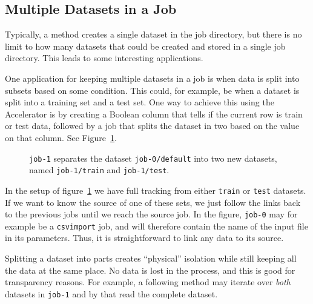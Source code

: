 \subsection{Multiple Datasets in a Job}

Typically, a method creates a single dataset in the job directory, but
there is no limit to how many datasets that could be created and
stored in a single job directory.  This leads to some interesting
applications.

One application for keeping multiple datasets in a job is when data is
split into subsets based on some condition.  This could, for example,
be when a dataset is split into a training set and a test set.  One
way to achieve this using the Accelerator is by creating a Boolean
column that tells if the current row is train or test data, followed
by a job that splits the dataset in two based on the value on that
column.  See Figure~\ref{fig:dep_dataset_csvimport_chain}.

\begin{figure}[h!]
  \hspace{1cm}
  
  \caption{\texttt{job-1} separates the dataset
    \texttt{job-0/default} into two new datasets, named
    \texttt{job-1/train} and \texttt{job-1/test}.}
  \label{fig:dep_dataset_csvimport_chain}
\end{figure}


In the setup of figure~\ref{fig:dep_dataset_csvimport_chain} we have
full tracking from either \texttt{train} or \texttt{test} datasets.
If we want to know the source of one of these sets, we just follow the
links back to the previous jobs until we reach the source job.  In the
figure, \texttt{job-0} may for example be a \texttt{csvimport} job,
and will therefore contain the name of the input file in its
parameters.  Thus, it is straightforward to link any data to its
source.

Splitting a dataset into parts creates ``physical'' isolation while
still keeping all the data at the same place.  No data is lost in the
process, and this is good for transparency reasons.  For example, a
following method may iterate over \textsl{both} datasets in
\texttt{job-1} and by that read the complete dataset.



